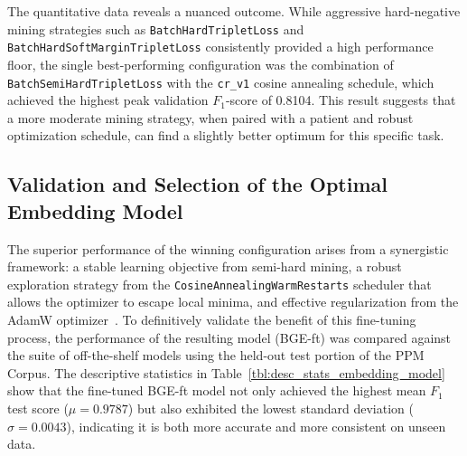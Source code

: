 The quantitative data reveals a nuanced outcome. While aggressive hard-negative mining strategies such as \verb|BatchHardTripletLoss| and \verb|BatchHardSoftMarginTripletLoss| consistently provided a high performance floor, the single best-performing configuration was the combination of \verb|BatchSemiHardTripletLoss| with the \verb|cr_v1| cosine annealing schedule, which achieved the highest peak validation \(F_1\)-score of 0.8104. This result suggests that a more moderate mining strategy, when paired with a patient and robust optimization schedule, can find a slightly better optimum for this specific task.

\subsection{Validation and Selection of the Optimal Embedding Model}\label{ch:4.4.3}
The superior performance of the winning configuration arises from a synergistic framework: a stable learning objective from semi-hard mining, a robust exploration strategy from the \verb|CosineAnnealingWarmRestarts| scheduler that allows the optimizer to escape local minima, and effective regularization from the AdamW optimizer~\cite{loshchilov2019decoupledweightdecayregularization, hermans2017defensetripletlossperson, Schroff_2015, loshchilovhutter}. To definitively validate the benefit of this fine-tuning process, the performance of the resulting model (BGE-ft) was compared against the suite of off-the-shelf models using the held-out test portion of the PPM Corpus. The descriptive statistics in Table~\ref{tbl:desc_stats_embedding_model} show that the fine-tuned BGE-ft model not only achieved the highest mean \(F_1\) test score (\(\mu = 0.9787\)) but also exhibited the lowest standard deviation (\(\sigma = 0.0043\)), indicating it is both more accurate and more consistent on unseen data.

\begin{table}[!ht]
    \captionsetup{skip=5pt}
\centering
\caption{Descriptive Statistics for F1-Scores by Embedding Model (Test Data)}
\label{tbl:desc_stats_embedding_model}
\end{table}

